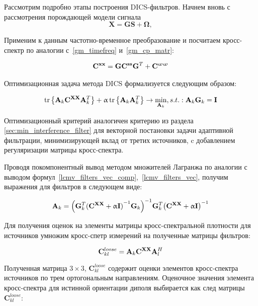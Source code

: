 Рассмотрим подробно этапы построения DICS-фильтров.
Начнем вновь с рассмотрения порождающей модели сигнала
\begin{equation}
    \mathbf{X} = \mathbf{G} \mathbf{S} + \mathbf{\Omega},
    \label{gm_dics}
\end{equation}


Применим к данным частотно-временное преобразование и посчитаем кросс-спектр по аналогии
с~\ref{gm_timefreq} и~\ref{gm_cp_matr}:

\begin{gather}
    \mathbf{C}^{\mathbf{x x}} = \mathbf{G} \mathbf{C}^{\mathbf{s s}} \mathbf{G}^T + \mathbf{C}^{\mathbf{\upomega \upomega}}
    \label{gm_cp_matr}
\end{gather}

Оптимизационная задача метода DICS формализуется следующим образом:

\begin{equation}
    \operatorname{tr}\left\{\mathbf{A}_k \mathbf{C}^{\mathbf{X X}} \mathbf{A}_k^T\right\} +
     \upalpha \operatorname{tr}\left\{\mathbf{A}_k \mathbf{A}_k^T\right\}
    \rightarrow \underset{\mathbf{A}_k}{\min}
    , s.t.: \mathbf{A}_k \mathbf{G}_k = \mathbf{I}
\end{equation}

Оптимизационный критерий аналогичен критерию из раздела \ref{sec:min_interference_filter}
для векторной постановки задачи адаптивной фильтрации,
минимизирующей вклад от третих источников, c добавлением регуляризации матрицы кросс-спектра.

Проводя покомпонентный вывод методом множителей Лагранжа по аналогии с
выводом формул~\ref{lcmv_filters_vec_comp},~\ref{lcmv_filters_vec}, получим
выражения для фильтров в следующем виде:

\begin{equation}
    \mathbf{A}_k =
    {\left(\mathbf{G}_k^T {(\mathbf{C}^{\mathbf{X X}} + \upalpha \mathbf{I})}^{-1} \mathbf{G}_k\right)}^{-1}
    \mathbf{G}_k^T {\left(\mathbf{C}^{\mathbf{X X}} + \upalpha \mathbf{I}\right)}^{-1}
\end{equation}

Для получения оценок на элементы матрицы кросс-спектральной плотности для источников
умножим кросс-спетр измерений на полученные матрицы фильтров:

\begin{equation}
    \mathbf{C}^{loose}_{kl} = \mathbf{A}_k \mathbf{C}^{\mathbf{X X}} \mathbf{A}_l^H
    \label{eq:dics_c_loose}
\end{equation}

Полученная матрица $3\times 3$, $\mathbf{C}^{loose}_{kl}$
содержит оценки элементов кросс-спектра источников по трем ортогональным направлениям.
Оценочное значения элемента кросс-спектра для истинной ориентации диполя
выбирается как след матрицы $\mathbf{C}^{loose}_{kl}$:

